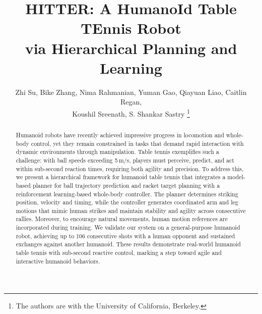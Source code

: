\documentclass[letterpaper, 10 pt, conference]{ieeeconf}  %
\title{\LARGE \bf
HITTER: A HumanoId Table TEnnis Robot \\ via Hierarchical Planning and Learning
}
\author{Zhi Su, Bike Zhang, Nima Rahmanian, Yuman Gao, Qiayuan Liao, Caitlin Regan,\\
Koushil Sreenath, S. Shankar Sastry %
\thanks{The authors are with the University of California, Berkeley.}
}
\begin{document}
\maketitle

\thispagestyle{empty}
\pagestyle{empty}


\begin{abstract}
Humanoid robots have recently achieved impressive progress in locomotion and whole-body control, yet they remain constrained in tasks that demand rapid interaction with dynamic environments through manipulation. Table tennis exemplifies such a challenge: with ball speeds exceeding 5\,m/s, players must perceive, predict, and act within sub-second reaction times, requiring both agility and precision. To address this, we present a hierarchical framework for humanoid table tennis that integrates a model-based planner for ball trajectory prediction and racket target planning with a reinforcement learning-based whole-body controller. The planner determines striking position, velocity and timing, while the controller generates coordinated arm and leg motions that mimic human strikes and maintain stability and agility across consecutive rallies. Moreover, to encourage natural movements, human motion references are incorporated during training. We validate our system on a general-purpose humanoid robot, achieving up to 106 consecutive shots with a human opponent and sustained exchanges against another humanoid. These results demonstrate real-world humanoid table tennis with sub-second reactive control, marking a step toward agile and interactive humanoid behaviors.


\end{abstract}











\end{document}

